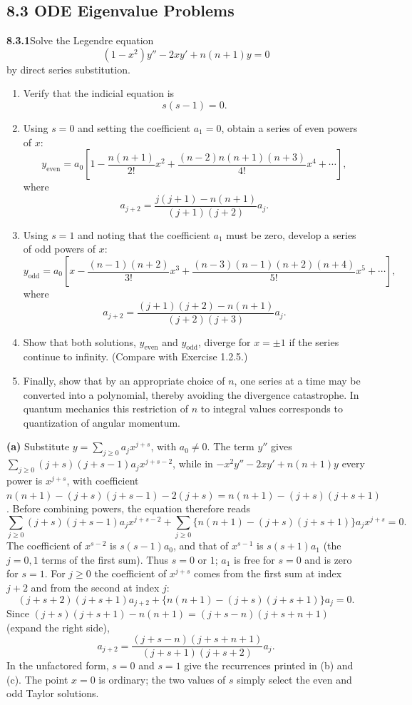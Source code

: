 \subsection*{8.3 ODE Eigenvalue Problems}

\par\bigskip
\noindent\textbf{8.3.1}\quad Solve the Legendre equation
\[
(1-x^{2})y''-2xy'+n(n+1)y=0
\]
by direct series substitution.
\begin{enumerate}
\item[(a)] Verify that the indicial equation is
  \[
  s(s-1)=0.
  \]
\item[(b)] Using $s=0$ and setting the coefficient $a_{1}=0$, obtain a series
  of even powers of $x$:
  \[
  y_{\mathrm{even}}=a_{0}\left[1-\frac{n(n+1)}{2!}x^{2}
  +\frac{(n-2)n(n+1)(n+3)}{4!}x^{4}+\cdots\right],
  \]
  where
  \[
  a_{j+2}=\frac{j(j+1)-n(n+1)}{(j+1)(j+2)}a_{j}.
  \]
\item[(c)] Using $s=1$ and noting that the coefficient $a_{1}$ must be zero,
  develop a series of odd powers of $x$:
  \[
  y_{\mathrm{odd}}=a_{0}\left[x-\frac{(n-1)(n+2)}{3!}x^{3}
  +\frac{(n-3)(n-1)(n+2)(n+4)}{5!}x^{5}+\cdots\right],
  \]
  where
  \[
  a_{j+2}=\frac{(j+1)(j+2)-n(n+1)}{(j+2)(j+3)}a_{j}.
  \]
\item[(d)] Show that both solutions, $y_{\mathrm{even}}$ and
  $y_{\mathrm{odd}}$, diverge for $x=\pm1$ if the series continue to infinity.
  (Compare with Exercise 1.2.5.)
\item[(e)] Finally, show that by an appropriate choice of $n$, one series at a
  time may be converted into a polynomial, thereby avoiding the divergence
  catastrophe. In quantum mechanics this restriction of $n$ to integral values
  corresponds to quantization of angular momentum.
\end{enumerate}
\solution
\textbf{(a)} Substitute $y=\sum_{j\ge0}a_jx^{j+s}$, with $a_0\ne0$.
The term $y''$ gives $\sum_{j\ge0}(j+s)(j+s-1)a_jx^{j+s-2}$, while
in $-x^2y''-2xy'+n(n+1)y$ every power is $x^{j+s}$, with coefficient
$n(n+1)-(j+s)(j+s-1)-2(j+s)=n(n+1)-(j+s)(j+s+1)$.
Before combining powers, the equation therefore reads
\[
\sum_{j\ge0}(j+s)(j+s-1)a_jx^{j+s-2}
+\sum_{j\ge0}\{n(n+1)-(j+s)(j+s+1)\}a_jx^{j+s}=0.
\]
The coefficient of $x^{s-2}$ is $s(s-1)a_0$, and that of $x^{s-1}$
is $s(s+1)a_1$ (the $j=0,1$ terms of the first sum).  Thus $s=0$ or
$1$; $a_1$ is free for $s=0$ and is zero for $s=1$.  For $j\ge0$ the
coefficient of $x^{j+s}$ comes from the first sum at index $j+2$ and
from the second at index $j$:
\[
(j+s+2)(j+s+1)a_{j+2}+\{n(n+1)-(j+s)(j+s+1)\}a_j=0.
\]
Since $(j+s)(j+s+1)-n(n+1)=(j+s-n)(j+s+n+1)$ (expand the right side),
\[
\boxed{a_{j+2}=\frac{(j+s-n)(j+s+n+1)}{(j+s+1)(j+s+2)}a_j}.
\]
In the unfactored form, $s=0$ and $s=1$ give the recurrences printed
in (b) and (c).
The point $x=0$ is ordinary; the two values of $s$ simply select the
even and odd Taylor solutions.

